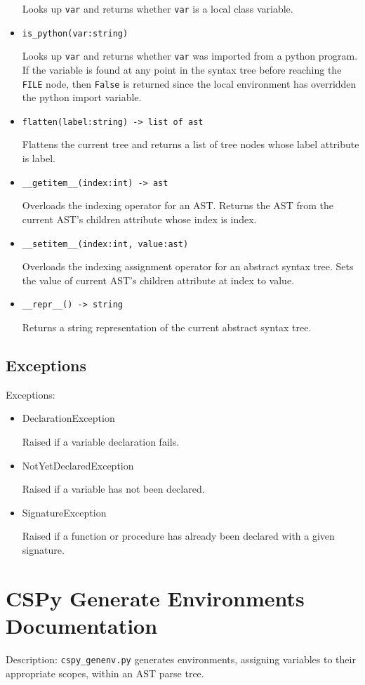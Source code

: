 \documentclass{article}
\begin{document}
\begin{itemize}
Looks up \verb|var| and returns whether \verb|var| is a local class variable. 
\item \verb|is_python(var:string)|

Looks up \verb|var| and returns whether \verb|var| was imported from a python program. If the variable is found at any point in the syntax tree before reaching the \verb|FILE| node, then \verb|False| is returned since the local environment has overridden the python import variable.
\item \verb|flatten(label:string) -> list of ast| 

Flattens the current tree and returns a list of tree nodes whose label attribute is label.
\item \verb|__getitem__(index:int) -> ast| 

Overloads the indexing operator for an AST. Returns the AST from the current AST's children attribute whose index is index.
\item \verb|__setitem__(index:int, value:ast)| 

Overloads the indexing assignment operator for an abstract syntax tree. Sets the value of current AST's children attribute at index to value.
\item \verb|__repr__() -> string| 

Returns a string representation of the current abstract syntax tree.
\end{itemize}
\subsection{Exceptions}
Exceptions:
\begin{itemize}
\item DeclarationException 

Raised if a variable declaration fails.
\item NotYetDeclaredException 

Raised if a variable has not been declared.
\item SignatureException 

Raised if a function or procedure has already been declared with a given signature.
\end{itemize}
\pagebreak

\section{CSPy Generate Environments Documentation}
Description: \verb|cspy_genenv.py| generates environments, assigning variables to their appropriate scopes, within an AST parse tree.
\end{document}
